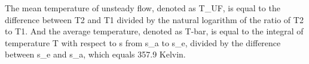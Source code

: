 The mean temperature of unsteady flow, denoted as T_UF, is equal to the difference between T2 and T1 divided by the natural logarithm of the ratio of T2 to T1. And the average temperature, denoted as T-bar, is equal to the integral of temperature T with respect to s from s_a to s_e, divided by the difference between s_e and s_a, which equals 357.9 Kelvin.